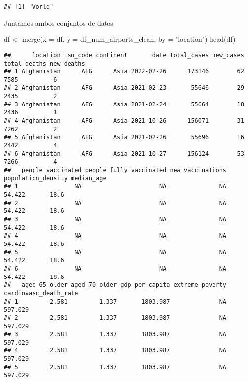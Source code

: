 \documentclass[
]{article}
\newenvironment{Shaded}{\begin{snugshade}}{\end{snugshade}}
\newcommand{\DataTypeTok}[1]{\textcolor[rgb]{0.87,0.87,0.75}{#1}}
\newcommand{\KeywordTok}[1]{\textcolor[rgb]{0.94,0.87,0.69}{#1}}
\newcommand{\NormalTok}[1]{\textcolor[rgb]{0.80,0.80,0.80}{#1}}
\newcommand{\StringTok}[1]{\textcolor[rgb]{0.80,0.58,0.58}{#1}}
\begin{document}
\begin{verbatim}
## [1] "World"
\end{verbatim}

Juntamos ambos conjuntos de datos

\begin{Shaded}
\begin{Highlighting}[]
\NormalTok{df <-}\StringTok{ }\KeywordTok{merge}\NormalTok{(}\DataTypeTok{x =}\NormalTok{ df, }\DataTypeTok{y =}\NormalTok{ df_num_airports_clean, }\DataTypeTok{by =} \StringTok{"location"}\NormalTok{)}
\KeywordTok{head}\NormalTok{(df)}
\end{Highlighting}
\end{Shaded}

\begin{verbatim}
##      location iso_code continent       date total_cases new_cases total_deaths new_deaths
## 1 Afghanistan      AFG      Asia 2022-02-26      173146        62         7585          6
## 2 Afghanistan      AFG      Asia 2021-02-23       55646        29         2435          2
## 3 Afghanistan      AFG      Asia 2021-02-24       55664        18         2436          1
## 4 Afghanistan      AFG      Asia 2021-10-26      156071        31         7262          2
## 5 Afghanistan      AFG      Asia 2021-02-26       55696        16         2442          4
## 6 Afghanistan      AFG      Asia 2021-10-27      156124        53         7266          4
##   people_vaccinated people_fully_vaccinated new_vaccinations population_density median_age
## 1                NA                      NA               NA             54.422       18.6
## 2                NA                      NA               NA             54.422       18.6
## 3                NA                      NA               NA             54.422       18.6
## 4                NA                      NA               NA             54.422       18.6
## 5                NA                      NA               NA             54.422       18.6
## 6                NA                      NA               NA             54.422       18.6
##   aged_65_older aged_70_older gdp_per_capita extreme_poverty cardiovasc_death_rate
## 1         2.581         1.337       1803.987              NA               597.029
## 2         2.581         1.337       1803.987              NA               597.029
## 3         2.581         1.337       1803.987              NA               597.029
## 4         2.581         1.337       1803.987              NA               597.029
## 5         2.581         1.337       1803.987              NA               597.029

\end{verbatim}
\end{document}
